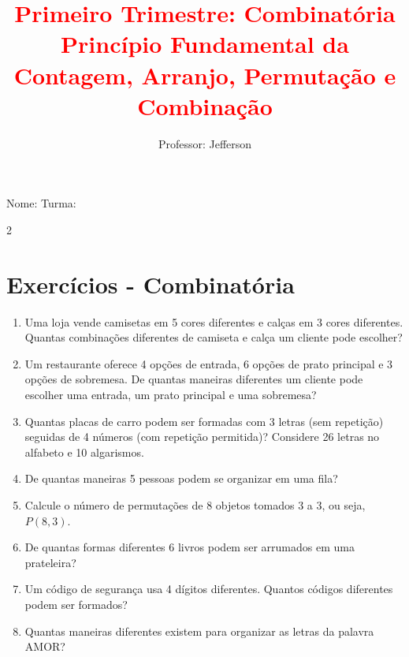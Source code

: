 \documentclass[11pt]{article}
\title{\textcolor{red}{Primeiro Trimestre: Combinatória
    \\Princípio Fundamental da Contagem, Arranjo, Permutação e Combinação}}
\author{Professor: Jefferson}
\date{}
\begin{document}
\maketitle
\vspace{-1cm}

\begin{center}
\large{Nome: \underline{\hspace{8cm}} \quad Turma: \underline{\hspace{3cm}}}
\end{center}

\begin{multicols}{2}

\section*{Exercícios - Combinatória}

\begin{enumerate}[leftmargin=*]

\item Uma loja vende camisetas em 5 cores diferentes e calças em 3 cores diferentes. Quantas combinações diferentes de camiseta e calça um cliente pode escolher?

\item Um restaurante oferece 4 opções de entrada, 6 opções de prato principal e 3 opções de sobremesa. De quantas maneiras diferentes um cliente pode escolher uma entrada, um prato principal e uma sobremesa?

\item Quantas placas de carro podem ser formadas com 3 letras (sem repetição) seguidas de 4 números (com repetição permitida)? Considere 26 letras no alfabeto e 10 algarismos.

\item De quantas maneiras 5 pessoas podem se organizar em uma fila?

\item Calcule o número de permutações de 8 objetos tomados 3 a 3, ou seja, $P(8,3)$.

\item De quantas formas diferentes 6 livros podem ser arrumados em uma prateleira?

\item Um código de segurança usa 4 dígitos diferentes. Quantos códigos diferentes podem ser formados?

\item Quantas maneiras diferentes existem para organizar as letras da palavra AMOR?


\end{enumerate}
\end{multicols}
\end{document}
